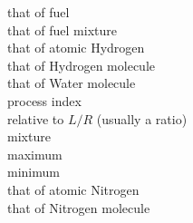 \begin{tabbing}
                 \> that of fuel                                                                                                                             \\
              \> that of fuel mixture                                                                                                                     \\
            \> that of atomic Hydrogen                                                                                                                  \\
           \> that of Hydrogen molecule                                                                                                                \\
          \> that of Water molecule                                                                                                                   \\
                                      \> process index                                                                                                                            \\
                                   \> relative to $L/R$ (usually a ratio)                                                                                                      \\
                                      \> mixture                                                                                                                                  \\
                                  \> maximum                                                                                                                                  \\
                                  \> minimum                                                                                                                                  \\
            \> that of atomic Nitrogen                                                                                                                  \\
           \> that of Nitrogen molecule                                                                                                                \\

\end{tabbing}
